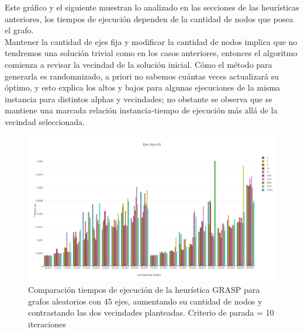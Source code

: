 Este gr\'afico y el siguiente muestran lo analizado en las secciones de las heur\'isticas anteriores, los tiempos de ejecuci\'on dependen de la cantidad de nodos que posea el grafo.\\

Mantener la cantidad de ejes fija y modificar la cantidad de nodos implica que no tendremos una soluci\'on trivial como en los casos anteriores, entonces el algoritmo comienza a revisar la vecindad de la soluci\'on inicial. C\'omo el m\'etodo para generarla es randomnizado, a priori no sabemos cu\'antas veces actualizar\'a su \'optimo, y esto explica los altos y bajos para algunas ejecuciones de la misma instancia para distintos alphas y vecindades; no obstante se observa que se mantiene una marcada relaci\'on instancia-tiempo de ejecuci\'on m\'as all\'a de la vecindad seleccionada.\\

  \begin{figure}[h!]
   \begin{center}
 	\includegraphics[scale=0.35]{imagenes/grasp/45ejes-10repes.png}
 	\caption{Comparaci\'on tiempos de ejecuci\'on de la heur\'istica GRASP para grafos aleatorios con 45 ejes, aumentando su cantidad de nodos y contrastando las dos vecindades planteadas. Criterio de parada = 10 iteraciones}
   \end{center}
 \end{figure}

